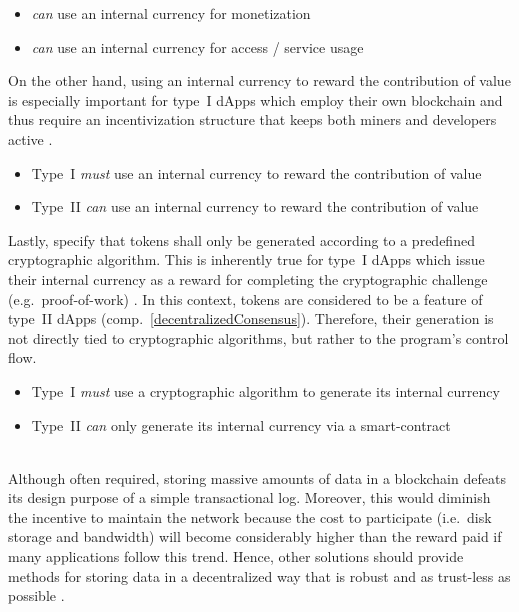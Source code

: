\begin{description}[format={\storedescriptionlabel}]
	\begin{itemize}
  		\item \textit{can} use an internal currency for monetization
  		\item \textit{can} use an internal currency for access / service usage
	\end{itemize}
	
	On the other hand, using an internal currency to reward the contribution of value is especially important for type~I \acp{dApp} which employ their own blockchain and thus require an incentivization structure that keeps both miners and developers active \cite[p.~9]{Raval.2016}.
	
	\begin{itemize}
		\item Type~I \textit{must} use an internal currency to reward the contribution of value
		\item Type~II \textit{can} use an internal currency to reward the contribution of value
	\end{itemize}
	
	Lastly, \citeauthor{Johnston2015} specify that tokens shall only be generated according to a predefined cryptographic algorithm. This is inherently true for type~I \acp{dApp} which issue their internal currency as a reward for completing the cryptographic challenge (e.g.~proof-of-work) \cite[pp.~3--4]{bitcoin}. In this context, tokens are considered to be a feature of type~II \acp{dApp} (comp.~\ref{decentralizedConsensus}). Therefore, their generation is not directly tied to cryptographic algorithms, but rather to the program's control flow.
	
	\begin{itemize}
		\item Type~I \textit{must} use a cryptographic algorithm to generate its internal currency
		\item Type~II \textit{can} only generate its internal currency via a smart-contract
	\end{itemize}
	
	\item[Decentralized protocols]
	\hfill \\
	Although often required, storing massive amounts of data in a blockchain defeats its design purpose of a simple transactional log. Moreover, this would diminish the incentive to maintain the network because the cost to participate (i.e.~disk storage and bandwidth) will become considerably higher than the reward paid if many applications follow this trend. Hence, other solutions should provide methods for storing data in a decentralized way that is robust and as trust-less as possible \cite[pp.~25]{Raval.2016}.  
	

\end{description}
